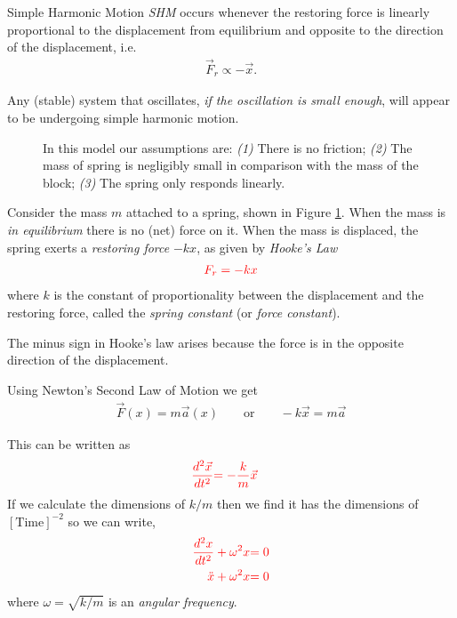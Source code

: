 \begin{mybox}{Simple Harmonic Motion}
\emph{SHM} occurs whenever the restoring force is linearly proportional to the displacement from equilibrium and opposite to the direction of the displacement, i.e. 
\begin{align}
\vec{F}_r \propto - \vec{x}. 
\end{align}
\end{mybox}
Any (stable) system that oscillates, \emph{if the oscillation is small enough}, will appear to be undergoing simple harmonic motion. 

\pagebreak
\begin{figure}[h!]
\caption{In this model our assumptions are: \emph{(1)} There is no friction; \emph{(2)} The mass of spring is negligibly small in comparison with the mass of the block; \emph{(3)} The spring only responds linearly.}
\label{Fig1_1}
\end{figure}

Consider the mass $m$ attached to a spring, shown in Figure \ref{Fig1_1}. When the mass is \emph{in equilibrium} there is no (net) force on it. When the mass is displaced, the spring exerts a \emph{restoring force} $-kx$, as given by \emph{Hooke's Law} 
\begin{align}
\textcolor{red}{F_r = -kx}
\end{align} 
where $k$ is the constant of proportionality between the displacement and the restoring force, called the \emph{spring constant} (or \emph{force constant}).

The minus sign in Hooke's law arises because the force is in the opposite direction of the displacement. 

Using Newton's Second Law of Motion we get
\begin{align}
\vec{F}(x) = m \vec{a}(x) \qquad \textrm{or}\qquad -k\vec{x} = m \vec{a} \label{eq:SpringEoM}
\end{align} 

This can be written as
\begin{align}
\textcolor{red}{\frac{d^2 \vec{x}}{dt^2}} &\textcolor{red}{= - \frac{k}{m} \vec{x}}
\end{align}
If we calculate the dimensions of $k/m$ then we find it has the dimensions of $[\textrm{Time}]^{-2}$ so we can write,
\begin{align}
\textcolor{red}{\frac{d^2 x}{dt^2} + \omega^2 x} &\textcolor{red}{= 0} \label{SHM_DE} \\
\textcolor{red}{\ddot{x} + \omega^2 x} &\textcolor{red}{= 0}  \nonumber
\end{align}
where $\omega = \sqrt{k/m}$ is an \emph{angular frequency}.

